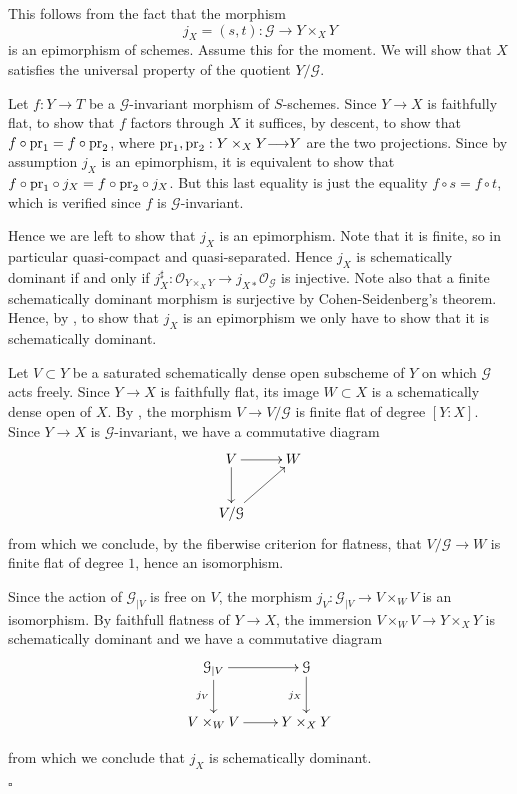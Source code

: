 \documentclass{amsart}
\newenvironment{demo}{{\flushleft \bf Proof~:}}{\hfill $\square$ \vspace{5mm}}
\theoremstyle{definition}
\theoremstyle{remark}
\begin{document}
\begin{demo}

This follows from the fact that the morphism \[ j_X=(s,t) : {{\mathcal G}} {\longrightarrow} Y \times_X Y \] is an epimorphism of schemes. Assume this for the moment. We will show that $X$ satisfies the universal property of the quotient $Y/{{\mathcal G}}$. 

Let $f : Y {\longrightarrow} T$ be a ${{\mathcal G}}$-invariant morphism of $S$-schemes. Since $Y {\longrightarrow} X$ is faithfully flat, to show that $f$ factors through $X$ it suffices, by descent, to show that $f \circ \textup{pr}_1 = f \circ \textup{pr}_2$, where $\textup{pr}_1, \textup{pr}_2 : Y \times_X Y {\longrightarrow} Y$ are the two projections. Since by assumption $j_X$ is an epimorphism, it is equivalent to show that $  f \circ \textup{pr}_1 \circ j_X= f \circ \textup{pr}_2 \circ j_X$. But this last equality is just the equality $f \circ s = f \circ t$, which is verified since $f$ is ${{\mathcal G}}$-invariant. 

Hence we are left to show that $j_X$ is an epimorphism. Note that it is finite, so in particular quasi-compact and quasi-separated. Hence $j_X$ is schematically dominant if and only if $j_X^\sharp : {{\mathcal O}}_{Y \times_X Y} {\longrightarrow} j_{X*}{{\mathcal O}}_{{\mathcal G}}$ is injective. Note also that a finite schematically dominant morphism is surjective by Cohen-Seidenberg's theorem. Hence, by \cite[Exp.VIII, Prop 5.1]{SGA1}, to show that $j_X$ is an epimorphism we only have to show that it is schematically dominant. 

Let $V \subset Y$ be a saturated schematically dense open subscheme of $Y$ on which ${{\mathcal G}}$ acts freely. Since $Y {\longrightarrow} X$ is faithfully flat, its image $W \subset X$ is a schematically dense open of $X$. 
By \cite[Exp V, th.4.1]{SGA3}, the morphism $V {\longrightarrow} V/{{\mathcal G}}$ is finite flat of degree $[Y:X]$. Since $Y {\longrightarrow} X$ is ${{\mathcal G}}$-invariant, we have a commutative diagram \[ \xymatrix{ V \ar[d] \ar[r] & W \\ V/{{\mathcal G}} \ar[ur] } \] from which we conclude, by the fiberwise criterion for flatness, that $V/{{\mathcal G}} {\longrightarrow} W$ is finite flat of degree $1$, hence an isomorphism. 

Since the action of ${{\mathcal G}}_{\vert V}$ is free on $V$, the morphism $j_V : {{\mathcal G}}_{\vert V} {\longrightarrow} V \times_W V$ is an isomorphism. By faithfull flatness of $Y {\longrightarrow} X$, the immersion $V \times_W V {\longrightarrow} Y \times_X Y$ is schematically dominant and we have a commutative diagram \[ \xymatrix{{{\mathcal G}}_{\vert V} \ar[r] \ar[d]_{j_V} & {{\mathcal G}} \ar[d]_{j_X} \\ V \times_W V \ar[r] & Y \times_X Y} \]

from which we conclude that $j_X$ is schematically dominant.

\end{demo}
\end{document}
